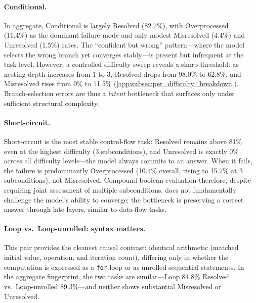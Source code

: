 \paragraph{Conditional.}
In aggregate, Conditional is largely Resolved (82.7\%), with Overprocessed (11.4\%) as the dominant failure mode and only modest Misresolved (4.4\%) and Unresolved (1.5\%) rates. The ``confident but wrong'' pattern---where the model selects the wrong branch yet converges stably---is present but infrequent at the task level. However, a controlled difficulty sweep reveals a sharp threshold: as nesting depth increases from 1 to 3, Resolved drops from 98.0\% to 62.8\%, and Misresolved rises from 0\% to 11.5\% (\cref{app:subsec:per_difficulty_breakdown}). Branch-selection errors are thus a \emph{latent} bottleneck that surfaces only under sufficient structural complexity.


\paragraph{Short-circuit.}
Short-circuit is the most stable control-flow task: Resolved remains above 81\% even at the highest difficulty (3 subconditions), and Unresolved is exactly 0\% across all difficulty levels---the model always commits to an answer. When it fails, the failure is predominantly Overprocessed (10.4\% overall, rising to 15.7\% at 3 subconditions), not Misresolved. Compound boolean evaluation therefore, despite requiring joint assessment of multiple subconditions, does not fundamentally challenge the model's ability to converge; the bottleneck is preserving a correct answer through late layers, similar to data-flow tasks.


\paragraph{Loop vs.\ Loop-unrolled: syntax matters.}
This pair provides the cleanest causal contrast: identical arithmetic (matched initial value, operation, and iteration count), differing only in whether the computation is expressed as a \texttt{for} loop or as unrolled sequential statements. In the aggregate fingerprint, the two tasks are similar---Loop 84.8\% Resolved vs.\ Loop-unrolled 89.3\%---and neither shows substantial Misresolved or Unresolved.

